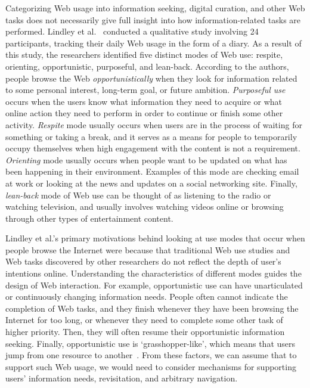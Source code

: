 \documentclass{sigchi}
\begin{document}
Categorizing Web usage into information seeking, digital curation, and other Web tasks does not necessarily give full insight into how information-related tasks are performed. Lindley et al.~\cite{lindley2012s} conducted a qualitative study involving 24 participants, tracking their daily Web usage in the form of a diary. As a result of this study, the researchers identified five distinct modes of Web use: respite, orienting, opportunistic, purposeful, and lean-back. According to the authors, people browse the Web \textit{opportunistically} when they look for information related to some personal interest, long-term goal, or future ambition. \textit{Purposeful use} occurs when the users know what information they need to acquire or what online action they need to perform in order to continue or finish some other activity. \textit{Respite} mode usually occurs when users are in the process of waiting for something or taking a break, and it serves as a means for people to temporarily occupy themselves when high engagement with the content is not a requirement. \textit{Orienting} mode usually occurs when people want to be updated on what has been happening in their environment. Examples of this mode are checking email at work or looking at the news and updates on a social networking site. Finally, \textit{lean-back} mode of Web use can be thought of as listening to the radio or watching television, and usually involves watching videos online or browsing through other types of entertainment content. 

Lindley et al.'s primary motivations behind looking at use modes that occur when people browse the Internet were because that traditional Web use studies and Web tasks discovered by other researchers do not reflect the depth of user's intentions online. Understanding the characteristics of different modes guides the design of Web interaction. For example, opportunistic use can have unarticulated or continuously changing information needs. People often cannot indicate the completion of Web tasks, and they finish whenever they have been browsing the Internet for too long, or whenever they need to complete some other task of higher priority. Then, they will often resume their opportunistic information seeking. Finally, opportunistic use is `grasshopper-like', which means that users jump from one resource to another~\cite{lindley2012s}. From these factors, we can assume that to support such Web usage, we would need to consider mechanisms for supporting users' information needs, revisitation, and arbitrary navigation.
\end{document}
